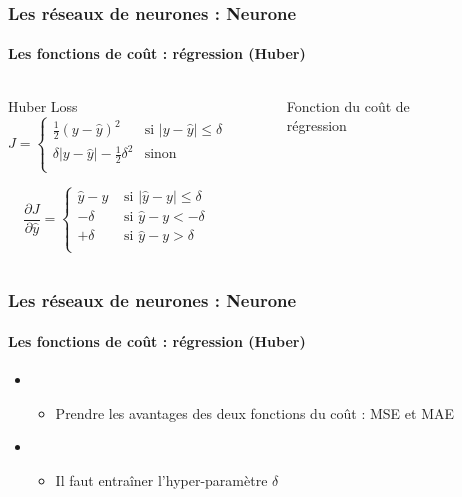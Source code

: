 \documentclass[xcolor=table]{beamer}
\begin{document}
\begin{frame}
\frametitle{Les réseaux de neurones : Neurone}
\framesubtitle{Les fonctions de coût : régression (Huber)}

\begin{columns}
\begin{column}{.68\linewidth}
\begin{block}{Huber Loss}
	\[J = %
	\begin{cases}
	\frac{1}{2} (y - \hat{y})^2 & \text{si } |y - \hat{y}| \le \delta \\
	\delta |y - \hat{y}| - \frac{1}{2} \delta^2 & \text{sinon }\\
	\end{cases}
	\]
	
	\[
	\frac{\partial J}{\partial \hat{y}} = 
	\begin{cases}
	\hat{y} - y & \text{ si } |\hat{y} - y| \le \delta \\
	-\delta & \text{ si } \hat{y} - y < -\delta \\
	+\delta & \text{ si } \hat{y} - y > \delta \\
	\end{cases}
	\]
	
\end{block}

\end{column}%
\begin{column}{.3\linewidth}
\begin{figure}
	\caption{Fonction du coût de régression \cite{2017-rosenberg}}
\end{figure}
\end{column}
\end{columns}

\end{frame}

\begin{frame}
\frametitle{Les réseaux de neurones : Neurone}
\framesubtitle{Les fonctions de coût : régression (Huber)}

\begin{itemize}
	\item {}
	\begin{itemize}
		\item Prendre les avantages des deux fonctions du coût : MSE et MAE
	\end{itemize}
	\item {}
	\begin{itemize}
		\item Il faut entraîner l'hyper-paramètre $\delta$
	\end{itemize}
\end{itemize}

\end{frame}
\end{document}
